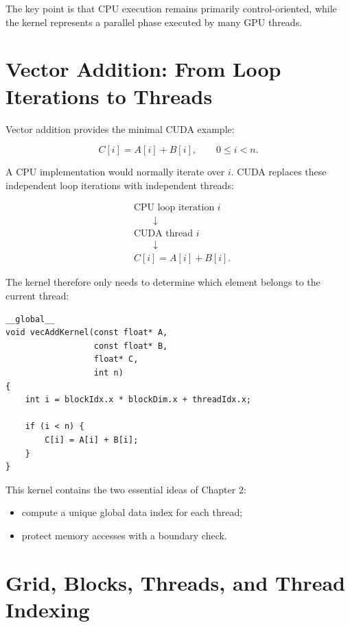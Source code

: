 \documentclass[11pt,a4paper]{article}
\begin{document}
The key point is that CPU execution remains primarily control-oriented, while the kernel represents a parallel phase executed by many GPU threads.

\section{Vector Addition: From Loop Iterations to Threads}

Vector addition provides the minimal CUDA example:

\[
C[i]=A[i]+B[i],
\qquad 0\le i<n.
\]

A CPU implementation would normally iterate over \(i\). CUDA replaces these independent loop iterations with independent threads:

\[
\begin{aligned}
&\text{CPU loop iteration }i \\
&\qquad\downarrow \\
&\text{CUDA thread }i \\
&\qquad\downarrow \\
&C[i]=A[i]+B[i].
\end{aligned}
\]

The kernel therefore only needs to determine which element belongs to the current thread:

\begin{lstlisting}
__global__
void vecAddKernel(const float* A,
                  const float* B,
                  float* C,
                  int n)
{
    int i = blockIdx.x * blockDim.x + threadIdx.x;

    if (i < n) {
        C[i] = A[i] + B[i];
    }
}
\end{lstlisting}

This kernel contains the two essential ideas of Chapter 2:

\begin{itemize}
    \item compute a unique global data index for each thread;
    \item protect memory accesses with a boundary check.
\end{itemize}

\section{Grid, Blocks, Threads, and Thread Indexing}
\end{document}
